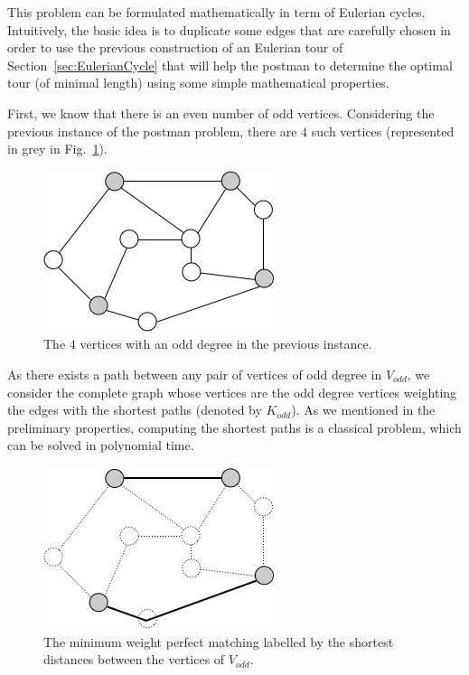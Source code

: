 \bigskip

This problem can be formulated mathematically in term of Eulerian
cycles.  Intuitively, the basic idea is to duplicate some edges that
are carefully chosen in order to use the previous construction of an
Eulerian tour of Section~\ref{sec:EulerianCycle} that will help the
postman to determine the optimal tour (of minimal length) using some
simple mathematical properties.
\bigskip

First, we know that there is an even number of odd vertices.
Considering the previous instance of the postman problem, there are $4$ such vertices (represented in grey in Fig.~\ref{fig:EulerianVodd}).

\begin{figure}[hbt]
\begin{center}
       \includegraphics[scale=0.6]{FiguresGraph/EulerienVodd}
       \caption{The $4$ vertices with an odd degree in the previous instance.}
              \label{fig:EulerianVodd}
\end{center}
\end{figure}
\bigskip

As there exists a path between any pair of vertices of odd degree in $V_{odd}$,
we consider the complete graph whose vertices are the odd degree vertices weighting the edges with the shortest paths (denoted by $K_{odd}$).
As we mentioned in the preliminary properties, computing the shortest paths is a classical problem, which can be solved in polynomial time. 

\begin{figure}[hbt]
\begin{center}
       \includegraphics[scale=0.6]{FiguresGraph/EulerienPerfectMatching}
       \caption{The minimum weight perfect matching labelled by the shortest distances between the vertices of $V_{odd}$.}
              \label{fig:Eulerianperfectmatching}
\end{center}
\end{figure}
\bigskip

